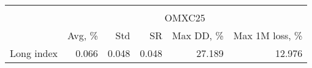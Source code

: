 \begin{tabular}{lrrrrr}
\hline \hline \\ [-1.8ex]
 & \multicolumn{5}{c}{OMXC25} \\
 \cmidrule(lr){2-6}
  & Avg, \% & Std & SR & Max DD, \% & Max 1M loss, \% \\
\midrule
Long index & 0.066 & 0.048 & 0.048 & 27.189 & 12.976 \\
\hline \hline
\end{tabular}